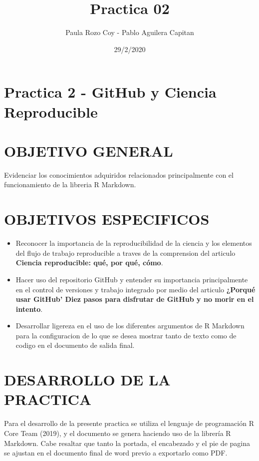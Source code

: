 \documentclass[
]{article}
\title{Practica 02}
\author{Paula Rozo Coy - Pablo Aguilera Capitan}
\date{29/2/2020}
\begin{document}
\maketitle

\hypertarget{practica-2---github-y-ciencia-reproducible}{%
\section{Practica 2 - GitHub y Ciencia
Reproducible}\label{practica-2---github-y-ciencia-reproducible}}

\hypertarget{objetivo-general}{%
\section{OBJETIVO GENERAL}\label{objetivo-general}}

Evidenciar los conocimientos adquiridos relacionados principalmente con
el funcionamiento de la libreria R Markdown.

\hypertarget{objetivos-especificos}{%
\section{OBJETIVOS ESPECIFICOS}\label{objetivos-especificos}}

\begin{itemize}
\item
  Reconocer la importancia de la reproducibilidad de la ciencia y los
  elementos del flujo de trabajo reproducible a traves de la comprension
  del articulo \textbf{Ciencia reproducible: qué, por qué, cómo}.
\item
  Hacer uso del repositorio GitHub y entender su importancia
  principalmente en el control de versiones y trabajo integrado por
  medio del articulo \textbf{¿Porqué usar GitHub' Diez pasos para
  disfrutar de GitHub y no morir en el intento}.
\item
  Desarrollar ligereza en el uso de los diferentes argumentos de R
  Markdown para la configuracion de lo que se desea mostrar tanto de
  texto como de codigo en el documento de salida final.
\end{itemize}

\hypertarget{desarrollo-de-la-practica}{%
\section{DESARROLLO DE LA PRACTICA}\label{desarrollo-de-la-practica}}

Para el desarrollo de la presente practica se utiliza el lenguaje de
programación R Core Team (2019), y el documento se genera haciendo uso
de la librería R Markdown. Cabe resaltar que tanto la portada, el
encabezado y el pie de pagina se ajustan en el documento final de word
previo a exportarlo como PDF.
\end{document}
